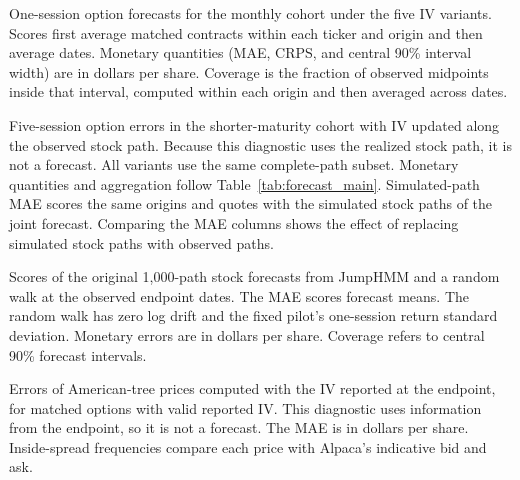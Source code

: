 \begin{table}[H]
\centering
\caption{One-session option forecasts for the monthly cohort under the five IV variants. Scores first average matched contracts within each ticker and origin and then average dates. Monetary quantities (MAE, CRPS, and central 90\% interval width) are in dollars per share. Coverage is the fraction of observed midpoints inside that interval, computed within each origin and then averaged across dates.}\label{tab:forecast_one_session}
\resizebox{\textwidth}{!}{}
\end{table}

\begin{table}[H]
\centering
\caption{Five-session option errors in the shorter-maturity cohort with IV updated along the observed stock path. Because this diagnostic uses the realized stock path, it is not a forecast. All variants use the same complete-path subset. Monetary quantities and aggregation follow Table~\ref{tab:forecast_main}. Simulated-path MAE scores the same origins and quotes with the simulated stock paths of the joint forecast. Comparing the MAE columns shows the effect of replacing simulated stock paths with observed paths.}\label{tab:forecast_conditional}
\resizebox{\textwidth}{!}{}
\end{table}

\begin{table}[H]
\centering
\caption{Scores of the original 1{,}000-path stock forecasts from JumpHMM and a random walk at the observed endpoint dates. The MAE scores forecast means. The random walk has zero log drift and the fixed pilot's one-session return standard deviation. Monetary errors are in dollars per share. Coverage refers to central 90\% forecast intervals.}\label{tab:forecast_stock}
\resizebox{\textwidth}{!}{}
\end{table}

\begin{table}[H]
\centering
\caption{Errors of American-tree prices computed with the IV reported at the endpoint, for matched options with valid reported IV. This diagnostic uses information from the endpoint, so it is not a forecast. The MAE is in dollars per share. Inside-spread frequencies compare each price with Alpaca's indicative bid and ask.}\label{tab:forecast_repricing}

\end{table}

